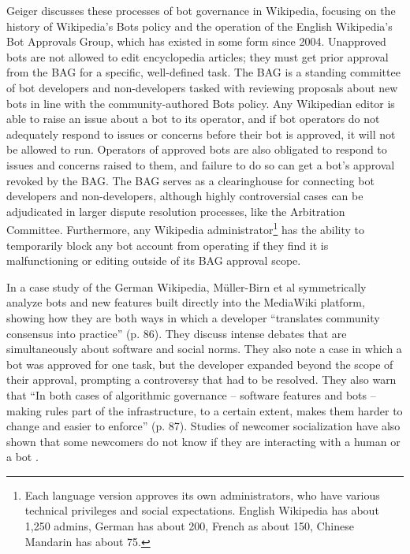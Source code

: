 \documentclass[format=acmsmall, review=false, screen=true]{acmart}%
\begin{document}
Geiger \cite{Geiger2011a} discusses these processes of bot governance in Wikipedia, focusing on the history of Wikipedia's Bots policy and the operation of the English Wikipedia's Bot Approvals Group, which has existed in some form since 2004. Unapproved bots are not allowed to edit encyclopedia articles; they must get prior approval from the BAG for a specific, well-defined task. The BAG is a standing committee of bot developers and non-developers tasked with reviewing proposals about new bots in line with the community-authored Bots policy. Any Wikipedian editor is able to raise an issue about a bot to its operator, and if bot operators do not adequately respond to issues or concerns before their bot is approved, it will not be allowed to run. Operators of approved bots are also obligated to respond to issues and concerns raised to them, and failure to do so can get a bot's approval revoked by the BAG. The BAG serves as a clearinghouse for connecting bot developers and non-developers, although highly controversial cases can be adjudicated in larger dispute resolution processes, like the Arbitration Committee.\cite{Bruckman2008} Furthermore, any Wikipedia administrator\footnote{Each language version approves its own administrators, who have various technical privileges and social expectations. English Wikipedia has about 1,250 admins, German has about 200, French as about 150, Chinese Mandarin has about 75.} has the ability to temporarily block any bot account from operating if they find it is malfunctioning or editing outside of its BAG approval scope. 

In a case study of the German Wikipedia,  M{\"{u}}ller-Birn et al \cite{Muller-Birn2013} symmetrically analyze bots and new features built directly into the MediaWiki platform, showing how they are both ways in which a developer ``translates community consensus into practice'' (p. 86). They discuss intense debates that are simultaneously about software and social norms. They also note a case in which a bot was approved for one task, but the developer expanded beyond the scope of their approval, prompting a controversy that had to be resolved. They also warn that ``In both cases of algorithmic governance -- software features and bots -- making rules part of the infrastructure, to a certain extent, makes them harder to change and easier to enforce'' (p. 87). Studies of newcomer socialization have also shown that some newcomers do not know if they are interacting with a human or a bot \cite{Ford2012}.  
\end{document}
